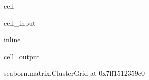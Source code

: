 \documentclass[letterpaper,table,10pt,english]{jupyterBook}
\begin{document}
\begin{sphinxuseclass}{cell}\begin{sphinxVerbatimInput}

\begin{sphinxuseclass}{cell_input}
\begin{sphinxVerbatim}[commandchars=\\\{\}]
 inline
  
\end{sphinxVerbatim}

\end{sphinxuseclass}\end{sphinxVerbatimInput}
\begin{sphinxVerbatimOutput}

\begin{sphinxuseclass}{cell_output}
\begin{sphinxVerbatim}[commandchars=\\\{\}]
\PYGZlt{}seaborn.matrix.ClusterGrid at 0x7ff1512359c0\PYGZgt{}
\end{sphinxVerbatim}

\noindent{}

\end{sphinxuseclass}\end{sphinxVerbatimOutput}

\end{sphinxuseclass}
\sphinxstepscope
\end{document}
